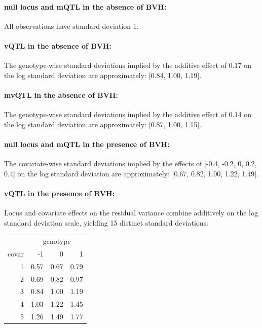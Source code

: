     \paragraph{null locus and mQTL in the absence of BVH:}
    All observations have standard deviation 1.

    \paragraph{vQTL in the absence of BVH:}
    The genotype-wise standard deviations implied by the additive effect of 0.17 on the log standard deviation are approximately: [0.84, 1.00, 1.19].

    \paragraph{mvQTL in the absence of BVH:}
    The genotype-wise standard deviations implied by the additive effect of 0.14 on the log standard deviation are approximately: [0.87, 1.00, 1.15].

    \paragraph{null locus and mQTL in the presence of BVH:}
    The covariate-wise standard deviations implied by the effects of [-0.4, -0.2, 0, 0.2, 0.4] on the log standard deviation are approximately:  [0.67, 0.82, 1.00, 1.22, 1.49].

    \paragraph{vQTL in the presence of BVH:}
      Locus and covariate effects on the residual variance combine additively on the log standard deviation scale, yielding 15 distinct standard deviations:
        \begin{table}[ht]
        \centering
        \begin{tabular}{rrrr}
            \hline
            & \multicolumn{3}{c}{genotype}\\
            \cmidrule{2-4}
            covar & -1 & 0 & 1 \\
            \hline
            1 & 0.57 & 0.67 & 0.79 \\
            2 & 0.69 & 0.82 & 0.97 \\
            3 & 0.84 & 1.00 & 1.19 \\
            4 & 1.03 & 1.22 & 1.45 \\
            5 & 1.26 & 1.49 & 1.77 \\
           \hline
        \end{tabular}
        \end{table}


